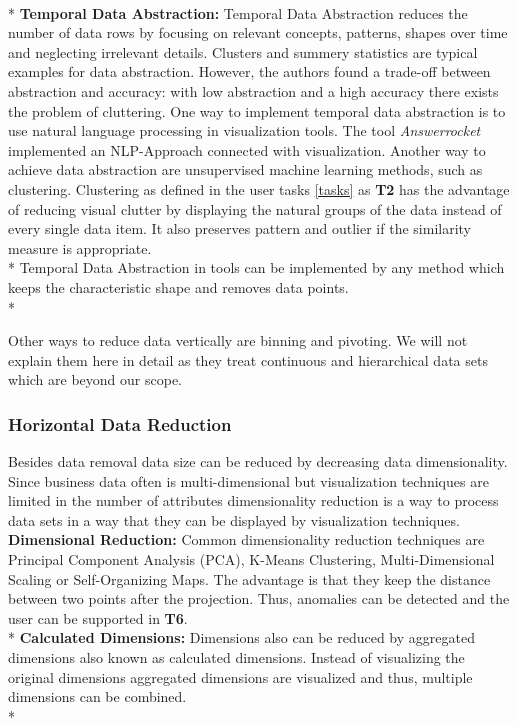 \\*
\textbf{Temporal Data Abstraction: }
Temporal Data Abstraction\cite{Aigner2011} reduces the number of data rows by focusing on relevant concepts, patterns, shapes over time and neglecting irrelevant details. Clusters and summery statistics\cite{PiringerHarald2011} are typical examples for data abstraction. However, the authors found a trade-off between abstraction and accuracy: with low abstraction and a high accuracy there exists the problem of cluttering. 
One way to implement temporal data abstraction is to use natural language processing in visualization tools. The tool \textit{Answerrocket} implemented an NLP-Approach connected with visualization. Another way to achieve data abstraction are unsupervised machine learning methods, such as clustering.
Clustering as defined in the user tasks \ref{tasks} as \textbf{T2} has the advantage of reducing visual clutter by displaying the natural groups of the data instead of every single data item. It also preserves pattern and outlier if the similarity measure is appropriate.\\*
Temporal Data Abstraction in tools can be implemented by any method which keeps the characteristic shape and removes data points. \\*

Other ways to reduce data vertically are binning and pivoting. We will not explain them here in detail as they treat continuous and hierarchical data sets which are beyond our scope. 

\subsubsection{Horizontal Data Reduction}
Besides data removal data size can be reduced by decreasing data dimensionality. Since business data often is multi-dimensional but visualization techniques are limited in the number of attributes dimensionality reduction is a way to process data sets in a way that they can be displayed by visualization techniques. 
\textbf{Dimensional Reduction: }Common dimensionality reduction techniques are Principal Component Analysis (PCA)\cite{Aigner2008}, K-Means Clustering\cite{AllenHamilton}, Multi-Dimensional Scaling or  Self-Organizing Maps\cite{PiringerHarald2011}. The advantage is that they keep the distance between two points after the projection. Thus, anomalies can be detected and the user can be supported in \textbf{T6}.\\* 
\textbf{Calculated Dimensions: }Dimensions also can be reduced by aggregated dimensions also known as calculated dimensions. Instead of visualizing the original dimensions aggregated dimensions are visualized and thus, multiple dimensions can be combined.\\*

